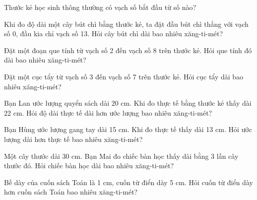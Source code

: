 \begin{ex}
Thước kẻ học sinh thông thường có vạch số bắt đầu từ số nào?
\end{ex}

\begin{ex}
Khi đo độ dài một cây bút chì bằng thước kẻ, ta đặt đầu bút chì thẳng với vạch số 0, đầu kia chỉ vạch số 13. Hỏi cây bút chì dài bao nhiêu xăng-ti-mét?
\end{ex}

\begin{ex}
Đặt một đoạn que tính từ vạch số 2 đến vạch số 8 trên thước kẻ. Hỏi que tính đó dài bao nhiêu xăng-ti-mét?
\end{ex}

\begin{ex}
Đặt một cục tẩy từ vạch số 3 đến vạch số 7 trên thước kẻ. Hỏi cục tẩy dài bao nhiêu xăng-ti-mét?
\end{ex}

\begin{ex}
Bạn Lan ước lượng quyển sách dài 20 cm. Khi đo thực tế bằng thước kẻ thấy dài 22 cm. Hỏi độ dài thực tế dài hơn ước lượng bao nhiêu xăng-ti-mét?
\end{ex}

\begin{ex}
Bạn Hùng ước lượng gang tay dài 15 cm. Khi đo thực tế thấy dài 13 cm. Hỏi ước lượng dài hơn thực tế bao nhiêu xăng-ti-mét?
\end{ex}

\begin{ex}
Một cây thước dài 30 cm. Bạn Mai đo chiếc bàn học thấy dài bằng 3 lần cây thước đó. Hỏi chiếc bàn học dài bao nhiêu xăng-ti-mét?
\end{ex}

\begin{ex}
Bề dày của cuốn sách Toán là 1 cm, cuốn từ điển dày 5 cm. Hỏi cuốn từ điển dày hơn cuốn sách Toán bao nhiêu xăng-ti-mét?
\end{ex}


